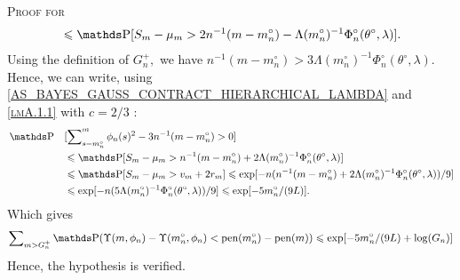 \begin{pro}{\textsc{Proof for } \\}
\begin{alignat*}{2}
& && \leq \P[S_{m} - \mu_{m} > 2 n^{-1} (m - m_{n}^{\circ}) - \Lambda(m_{n}^{\circ})^{-1} \Phi_{n}^{\circ}(\theta^{\circ}, \lambda)].
\end{alignat*}
Using the definition of $G_{n}^{+},$ we have $n^{-1} (m - m_{n}^{\circ}) > 3 \Lambda(m_{n}^{\circ})^{-1}\Phi_{n}^{\circ}(\theta^{\circ}, \lambda).$
Hence, we can write, using \textsc{\cref{AS_BAYES_GAUSS_CONTRACT_HIERARCHICAL_LAMBDA}} and \textsc{\cref{lmA.1.1}} with $c = 2/3$ :
\begin{alignat*}{2}
& \P&&[\sum\nolimits_{s = m_{n}^{\circ}}^{m} \phi_{n}(s)^{2} -  3 n^{-1} (m - m_{n}^{\circ}) > 0 ]\\
& && \leq \P[S_{m} - \mu_{m} > n^{-1} (m - m_{n}^{\circ}) + 2 \Lambda(m_{n}^{\circ})^{-1} \Phi_{n}^{\circ}(\theta^{\circ}, \lambda)]\\
& && \leq \P[S_{m} - \mu_{m} > v_{m} + 2 r_{m}] \leq \exp[- n (n^{-1} (m - m_{n}^{\circ}) + 2 \Lambda(m_{n}^{\circ})^{-1} \Phi_{n}^{\circ}(\theta^{\circ}, \lambda))/9]\\
& && \leq \exp[- n (5 \Lambda(m_{n}^{\circ})^{-1} \Phi_{n}^{\circ}(\theta^{\circ}, \lambda))/9 ] \leq \exp[- 5 m_{n}^{\circ}/(9 L)].
\end{alignat*}
Which gives
\[ \sum\nolimits_{m > G^{+}_{n}} \P(\Upsilon(m, \phi_{n}) - \Upsilon(m^{\circ}_{n}, \phi_{n}) < \pen(m^{\circ}_{n}) - \pen(m)) \leq \exp[- 5 m_{n}^{\circ}/(9 L) + \log (G_{n})]\]
Hence, the hypothesis is verified.


\end{pro}
